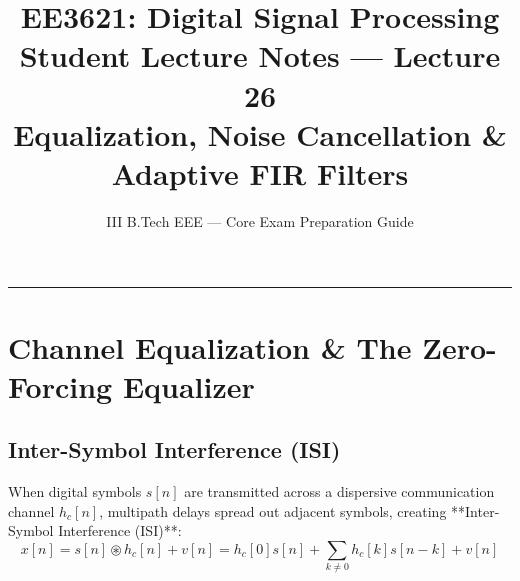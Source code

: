 \documentclass[11pt,a4paper]{article}
\title{\textbf{EE3621: Digital Signal Processing} \\ \Large Student Lecture Notes — Lecture 26 \\ \large Equalization, Noise Cancellation \& Adaptive FIR Filters}
\author{III B.Tech EEE — Core Exam Preparation Guide}
\date{}
\begin{document}
\maketitle

\noindent\rule{\textwidth}{0.5pt}

\section{Channel Equalization \& The Zero-Forcing Equalizer}

\subsection{Inter-Symbol Interference (ISI)}
When digital symbols $s[n]$ are transmitted across a dispersive communication channel $h_c[n]$, multipath delays spread out adjacent symbols, creating **Inter-Symbol Interference (ISI)**:
\begin{equation}
x[n] = s[n] \circledast h_c[n] + v[n] = h_c[0]s[n] + \sum_{k \ne 0} h_c[k]s[n-k] + v[n]
\end{equation}
\end{document}

